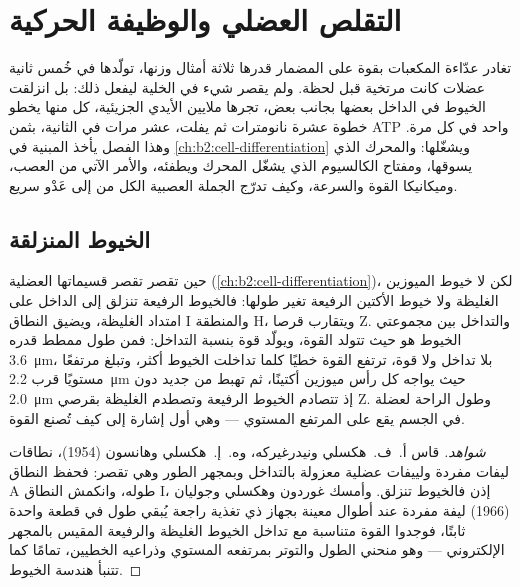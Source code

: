 \chapter{التقلص العضلي والوظيفة الحركية}\label{ch:b2:muscle-movement}

تغادر عدّاءة المكعبات بقوة على المضمار قدرها ثلاثة
أمثال وزنها، تولّدها في خُمس ثانية عضلات كانت
مرتخية قبل لحظة. ولم يقصر شيء في الخلية ليفعل
ذلك: بل انزلقت الخيوط في الداخل بعضها بجانب بعض، تجرها ملايين
الأيدي الجزيئية، كل منها يخطو خطوة عشرة نانومترات ثم يفلت،
عشر مرات في الثانية، بثمن ATP واحد في كل مرة. وهذا الفصل
يأخذ  المبنية في \cref{ch:b2:cell-differentiation}
ويشغّلها:  والمحرك الذي
يسوقها، ومفتاح الكالسيوم الذي يشغّل المحرك ويطفئه،
والأمر الآتي من العصب، وميكانيكا القوة والسرعة،
وكيف تدرّج الجملة العصبية الكل من  إلى
عَدْو سريع.

\section{الخيوط المنزلقة}

\begin{proposition}\label{prop:b2:muscle-movement:sliding}
حين تقصر  تقصر قسيماتها العضلية
(\cref{ch:b2:cell-differentiation})، لكن لا خيوط الميوزين الغليظة
ولا خيوط الأكتين الرفيعة تغير طولها: فالخيوط الرفيعة
تنزلق إلى الداخل على امتداد الغليظة، ويضيق النطاق I والمنطقة
H، ويتقارب قرصا Z. والتداخل بين مجموعتي
الخيوط هو حيث تتولد القوة، ويولّد 
قوة بنسبة التداخل: فمن طول ممطط قدره
\qty{3.6}{\micro m}، بلا تداخل ولا قوة، ترتفع
القوة خطيًا كلما تداخلت الخيوط أكثر، وتبلغ
مرتفعًا مستويًا قرب \qty{2.2}{\micro m} حيث يواجه كل رأس ميوزين أكتينًا،
ثم تهبط من جديد دون \qty{2.0}{\micro m} إذ تتصادم الخيوط الرفيعة
وتصطدم الغليظة بقرصي Z. وطول الراحة لعضلة
في الجسم يقع على المرتفع المستوي --- وهي أول إشارة
إلى كيف تُصنع القوة.
\end{proposition}
\begin{proof}[شواهد]
قاس أ.~ف.~هكسلي ونيدرغيركه، وه.~إ.~هكسلي وهانسون (1954)،
نطاقات ليفات مفردة ولييفات عضلية معزولة
بالتداخل وبمجهر الطور وهي تقصر: فحفظ النطاق A
طوله، وانكمش النطاق I، إذن فالخيوط تنزلق. وأمسك غوردون
وهكسلي وجوليان (1966) ليفة مفردة عند أطوال معينة بجهاز
ذي تغذية راجعة يُبقي طول  في قطعة واحدة ثابتًا،
فوجدوا القوة متناسبة مع تداخل الخيوط الغليظة
والرفيعة المقيس بالمجهر الإلكتروني --- وهو منحني الطول والتوتر
بمرتفعه المستوي وذراعيه الخطيين، تمامًا كما تتنبأ هندسة
الخيوط.
\end{proof}

